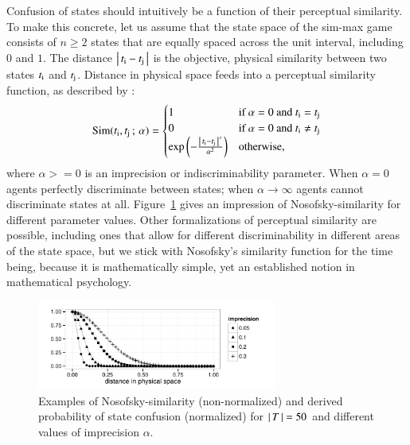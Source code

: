 \documentclass[fleqn,reqno,10pt]{article}
\newcommand{\impairment}{\ensuremath{\alpha}} %
\newcommand{\similarity}{\ensuremath{\mathrm{Sim}}} %
\begin{document}
Confusion of states should intuitively be a function of their
perceptual similarity. To make this concrete, let us assume that the
state space of the sim-max game consists of $n \ge 2$ states that are
equally spaced across the unit interval, including $0$ and $1$. The
distance $\left \lvert \, t_{\mathrm{i}} - t_{\mathrm{j}} \, \right\rvert$ is the objective, physical
similarity between two states $t_{\mathrm{i}}$ and
$t_{\mathrm{j}}$. Distance in physical space feeds into a perceptual
similarity function, as described by
\citet{Nosofsky1986:Attention-Simil}:
\begin{align*}
  \similarity(\mystate{i}, \mystate{j} \myts ; \myts \impairment) =
      \begin{cases}
    1 & \textrm{if } \impairment = 0 \textrm{ and } \mystate{i} = \mystate{j} \\
    0 & \textrm{if } \impairment = 0 \textrm{ and } \mystate{i} \neq \mystate{j} \\
 \expo \left ( -  \frac{\card{\mystate{i} - \mystate{j}}^s}{ \impairment^2} \right ) & \textrm{otherwise,} \\
    \end{cases}
\end{align*}
where $\impairment >= 0$ is an imprecision or indiscriminability
parameter. When $\impairment=0$ agents perfectly discriminate between
states; when $\impairment \rightarrow \infty$ agents cannot
discriminate states at all. Figure~\ref{fig:NosofskySim} gives an
impression of Nosofsky-similarity for different parameter
values. Other formalizations of perceptual similarity are possible,
including ones that allow for different discriminability in different
areas of the state space, but we stick with Nosofsky's similarity
function for the time being, because it is mathematically simple, yet
an established notion in mathematical psychology.

\begin{figure}
  \centering

  \includegraphics[width=0.7\textwidth]{plots/NosofskySim.pdf}

  \caption{Examples of Nosofsky-similarity (non-normalized) and
    derived probability of state confusion (normalized) for
    $\left \lvert \, T \, \right\rvert = 50$ and different
    values of imprecision $\impairment$.}
  \label{fig:NosofskySim}
\end{figure}
\end{document}
